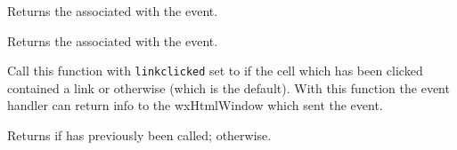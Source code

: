 
Returns the  associated with the event.


\label{wxhtmlcelleventgetpoint}


Returns the  associated with the event.


\label{wxhtmlcelleventsetlinkclicked}


Call this function with {\tt linkclicked} set to \true if the cell which has been clicked contained a link or
\false otherwise (which is the default). With this function the event handler can return info to the
wxHtmlWindow which sent the event.


\label{wxhtmlcelleventgetlinkclicked}


Returns \true if  has previously been called;
\false otherwise.

